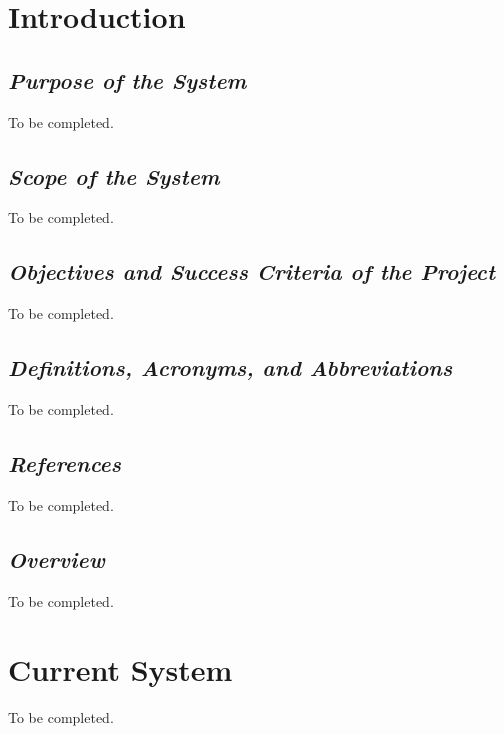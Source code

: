 \documentclass[a4paper]{article}
\begin{document}
\section{Introduction}
	\begin{minipage}{0.9\textwidth}
		\subsection{\textit{Purpose of the System}}
		To be completed.
		
		\subsection{\textit{Scope of the System}}
		To be completed.
		
		\subsection{\textit{Objectives and Success Criteria of the Project}}
		To be completed.
		
		\subsection{\textit{Definitions, Acronyms, and Abbreviations}}
		To be completed.
		
		\subsection{\textit{References}}
		To be completed.
		
		\subsection{\textit{Overview}}
		To be completed.
		
	\end{minipage}

\newpage
\section{Current System}
	To be completed.
	
\newpage
\end{document}
